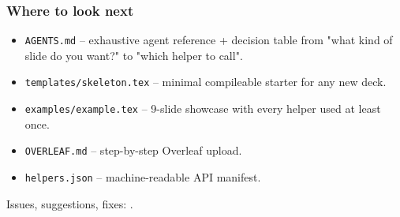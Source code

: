 \documentclass[aspectratio=169]{beamer}
\begin{document}
\begin{frame}[t]
  \frametitle{Where to look next}

  \begin{itemize}
    \setlength\itemsep{0.35em}
    \item \texttt{AGENTS.md} -- exhaustive agent reference + decision
          table from "what kind of slide do you want?" to "which helper
          to call".
    \item \texttt{templates/skeleton.tex} -- minimal compileable
          starter for any new deck.
    \item \texttt{examples/example.tex} -- 9-slide showcase with every
          helper used at least once.
    \item \texttt{OVERLEAF.md} -- step-by-step Overleaf upload.
    \item \texttt{helpers.json} -- machine-readable API manifest.
  \end{itemize}

  \vspace{0.6em}
  Issues, suggestions, fixes:
  .
\end{frame}

\hsgclosing
\end{document}
